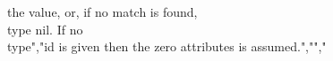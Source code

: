 the value, or, if no match is found, \\type {nil}. If no \\type","{id} is given then the zero attributes is assumed.","","%